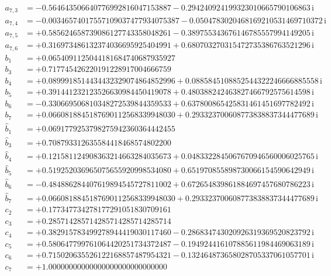 {\begin{align*}
a_{7,3} &= -0.564643506640776992816047153887 - 0.294240924199323010665790106863\,\mathrm{i}\\
a_{7,4} &= -0.00346574017557109037477934075387 - 0.0504783020468169210531469710372\,\mathrm{i}\\
a_{7,5} &= +0.585624658739086127743358048261 - 0.389755343676146785557994149205\,\mathrm{i}\\
a_{7,6} &= +0.316973486132374036695925404991 + 0.680703270315472735386763521296\,\mathrm{i}\\[1mm]
b_{1} &= +0.0654091125044181684740687935927\\
b_{3} &= +0.717745426220191228917004666759\\
b_{4} &= +0.0899918514434432329074864852996 + 0.0885845108852544322246666885558\,\mathrm{i}\\
b_{5} &= +0.391441232123526630984450419078 + 0.480388242463827466792575614598\,\mathrm{i}\\
b_{6} &= -0.330669506810348272539844359533 + 0.637800865425831461451697782492\,\mathrm{i}\\
b_{7} &= +0.0660818845187690112568339948030 + 0.293323700608773838837344477689\,\mathrm{i}\\[1mm]
\hat b_{1} &= +0.0691779253798275942360364442455\\
\hat b_{3} &= +0.708793312635584418468574802200\\
\hat b_{4} &= +0.121581124908363214663284035673 + 0.0483322845067670946560006025765\,\mathrm{i}\\
\hat b_{5} &= +0.519252036965075655920998534080 + 0.651970855898730066154590642949\,\mathrm{i}\\
\hat b_{6} &= -0.484886284407619894545727811002 + 0.672654839861884697457680786223\,\mathrm{i}\\
\hat b_{7} &= +0.0660818845187690112568339948030 + 0.293323700608773838837344477689\,\mathrm{i}\\[1mm]
c_{2} &= +0.177347734278177291051830709161\\
c_{3} &= +0.285714285714285714285714285714\\
c_{4} &= +0.382915783499278944419030117460 - 0.286834743020926319369520823792\,\mathrm{i}\\
c_{5} &= +0.580647799761064420251734372487 - 0.194924416107885611984469063189\,\mathrm{i}\\
c_{6} &= +0.715020635526122168857487954321 - 0.132464873658028705337061057701\,\mathrm{i}\\
c_{7} &= +1.00000000000000000000000000000
\end{align*}
}

